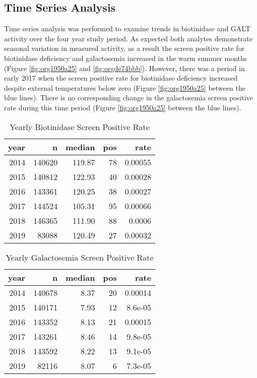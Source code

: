 \documentclass[review]{elsarticle}
\begin{document}
\subsection*{Time Series Analysis}
\label{sec:org7fa0ce9}
Time series analysis was performed to examine trends in biotinidase
and GALT activity over the four year study period. As expected both
analytes demonstrate seasonal variation in measured activity, as a
result the screen positive rate for biotinidase deficiency and
galactosemia increased in the warm summer months (Figure \ref{fig:org1950a25}
and \ref{fig:orgde74bbb}). However, there was a period in early 2017 when the
screen positive rate for biotinidase deficiency increased despite
external temperatures below zero (Figure \ref{fig:org1950a25} between the blue
lines). There is no corresponding change in the galactosemia screen
positive rate during this time period (Figure \ref{fig:org1950a25} between the
blue lines).

\begin{table}[ht]
\centering
\begin{tabular}{rrrrr}
  \hline
year & n & median & pos & rate \\ 
  \hline
2014 & 140620 & 119.87 &  78 & 0.00055 \\ 
  2015 & 140812 & 122.93 &  40 & 0.00028 \\ 
  2016 & 143361 & 120.25 &  38 & 0.00027 \\ 
  2017 & 144524 & 105.31 &  95 & 0.00066 \\ 
  2018 & 146365 & 111.90 &  88 & 0.0006 \\ 
  2019 & 83088 & 120.49 &  27 & 0.00032 \\ 
   \hline
\end{tabular}
\caption{Yearly Biotinidase Screen Positive Rate} 
\label{tab:biot_year}
\end{table}

\begin{table}[ht]
\centering
\begin{tabular}{rrrrr}
  \hline
year & n & median & pos & rate \\ 
  \hline
2014 & 140678 & 8.37 &  20 & 0.00014 \\ 
  2015 & 140171 & 7.93 &  12 & 8.6e-05 \\ 
  2016 & 143352 & 8.13 &  21 & 0.00015 \\ 
  2017 & 143261 & 8.46 &  14 & 9.8e-05 \\ 
  2018 & 143592 & 8.22 &  13 & 9.1e-05 \\ 
  2019 & 82116 & 8.07 &   6 & 7.3e-05 \\ 
   \hline
\end{tabular}
\caption{Yearly Galactosemia Screen Positive Rate} 
\label{tab:galt_year}
\end{table}
\end{document}
